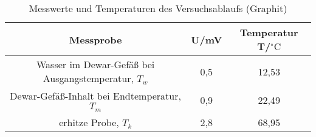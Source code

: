 \begin{table}[h]
	\begin{center}
		\begin{tabular}{ccc}
			Messprobe & U/mV & Temperatur T/$^{\circ}\mathrm{C}$\\ \hline
			Wasser im Dewar-Gefäß bei Ausgangstemperatur, $T_w$& 0,5 & 12,53\\
			Dewar-Gefäß-Inhalt bei Endtemperatur, $T_m$&0,9&22,49\\
			erhitze Probe, $T_k$&2,8&68,95
		\end{tabular}
		\caption{Messwerte und Temperaturen des Versuchsablaufs (Graphit)}
		\label{tabgraphit1}
	\end{center}
\end{table}